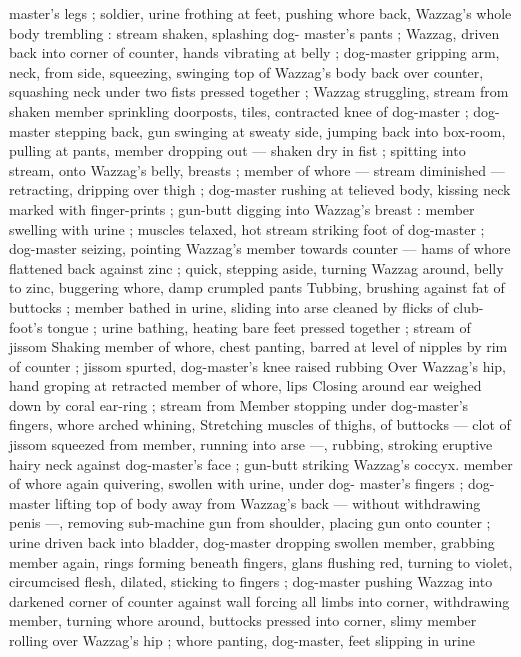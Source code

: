 master's legs ; soldier, urine frothing at feet, pushing whore back, 
Wazzag's whole body trembling : stream shaken, splashing dog- 
master's pants ; Wazzag, driven back into corner of counter, hands 
vibrating at belly ; dog-master gripping arm, neck, from side, 
squeezing, swinging top of Wazzag's body back over counter, 
squashing neck under two fists pressed together ; Wazzag 
struggling, stream from shaken member sprinkling doorposts, tiles, 
contracted knee of dog-master ; dog-master stepping back, gun 
swinging at sweaty side, jumping back into box-room, pulling at 
pants, member dropping out --- shaken dry in fist ; spitting into 
stream, onto Wazzag's belly, breasts ; member of whore --- stream 
diminished --- retracting, dripping over thigh ; dog-master rushing at 
telieved body, kissing neck marked with finger-prints ; gun-butt 
digging into Wazzag's breast : member swelling with urine ; muscles 
telaxed, hot stream striking foot of dog-master ; dog-master seizing, 
pointing Wazzag's member towards counter --- hams of whore 
flattened back against zinc ; quick, stepping aside, turning Wazzag 
around, belly to zinc, buggering whore, damp crumpled pants 
Tubbing, brushing against fat of buttocks ; member bathed in urine, 
sliding into arse cleaned by flicks of club-foot's tongue ; urine 
bathing, heating bare feet pressed together ; stream of jissom 
Shaking member of whore, chest panting, barred at level of nipples 
by rim of counter ; jissom spurted, dog-master's knee raised rubbing 
Over Wazzag's hip, hand groping at retracted member of whore, lips 
Closing around ear weighed down by coral ear-ring ; stream from 
Member stopping under dog-master's fingers, whore arched whining, 
Stretching muscles of thighs, of buttocks --- clot of jissom squeezed 
from member, running into arse ---, rubbing, stroking eruptive hairy 
neck against dog-master's face ; gun-butt striking Wazzag's coccyx. 
member of whore again quivering, swollen with urine, under dog- 
master's fingers ; dog-master lifting top of body away from Wazzag's 
back --- without withdrawing penis ---, removing sub-machine gun 
from shoulder, placing gun onto counter ; urine driven back into 
bladder, dog-master dropping swollen member, grabbing member 
again, rings forming beneath fingers, glans flushing red, turning to 
violet, circumcised flesh, dilated, sticking to fingers ; dog-master 
pushing Wazzag into darkened corner of counter against wall 
forcing all limbs into corner, withdrawing member, turning whore 
around, buttocks pressed into corner, slimy member rolling over 
Wazzag's hip ; whore panting, dog-master, feet slipping in urine 

